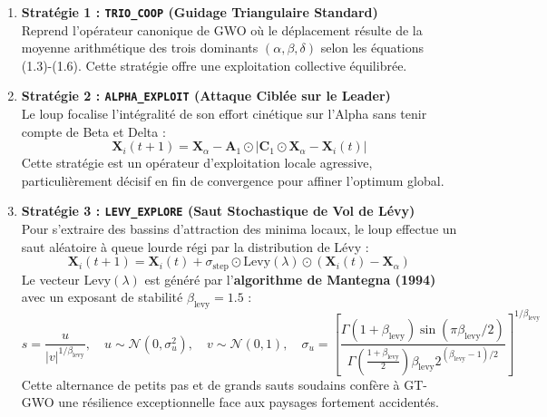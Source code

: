 \begin{enumerate}[label=\textbf{\arabic*.}]
    \item \textbf{Stratégie 1 : \texttt{TRIO\_COOP} (Guidage Triangulaire Standard)} \\
    Reprend l'opérateur canonique de GWO où le déplacement résulte de la moyenne arithmétique des trois dominants $(\alpha, \beta, \delta)$ selon les équations (1.3)-(1.6). Cette stratégie offre une exploitation collective équilibrée.
    
    \item \textbf{Stratégie 2 : \texttt{ALPHA\_EXPLOIT} (Attaque Ciblée sur le Leader)} \\
    Le loup focalise l'intégralité de son effort cinétique sur l'Alpha sans tenir compte de Beta et Delta :
    \begin{equation}
        \mathbf{X}_i(t+1) = \mathbf{X}_\alpha - \mathbf{A}_1 \odot |\mathbf{C}_1 \odot \mathbf{X}_\alpha - \mathbf{X}_i(t)|
    \end{equation}
    Cette stratégie est un opérateur d'exploitation locale agressive, particulièrement décisif en fin de convergence pour affiner l'optimum global.

    \item \textbf{Stratégie 3 : \texttt{LEVY\_EXPLORE} (Saut Stochastique de Vol de Lévy)} \\
    Pour s'extraire des bassins d'attraction des minima locaux, le loup effectue un saut aléatoire à queue lourde régi par la distribution de Lévy :
    \begin{equation}
        \mathbf{X}_i(t+1) = \mathbf{X}_i(t) + \sigma_{\text{step}} \odot \text{Levy}(\lambda) \odot (\mathbf{X}_i(t) - \mathbf{X}_\alpha)
    \end{equation}
    Le vecteur $\text{Levy}(\lambda)$ est généré par l'\textbf{algorithme de Mantegna (1994)} \cite{mantegna1994fast} avec un exposant de stabilité $\beta_{\text{levy}} = 1.5$ :
    \begin{equation}
        s = \frac{u}{|v|^{1/\beta_{\text{levy}}}}, \quad u \sim \mathcal{N}(0, \sigma_u^2), \quad v \sim \mathcal{N}(0, 1), \quad \sigma_u = \left[\frac{\Gamma(1+\beta_{\text{levy}})\sin(\pi\beta_{\text{levy}}/2)}{\Gamma\left(\frac{1+\beta_{\text{levy}}}{2}\right)\beta_{\text{levy}} 2^{(\beta_{\text{levy}}-1)/2}}\right]^{1/\beta_{\text{levy}}}
    \end{equation}
    Cette alternance de petits pas et de grands sauts soudains confère à GT-GWO une résilience exceptionnelle face aux paysages fortement accidentés.


\end{enumerate}
